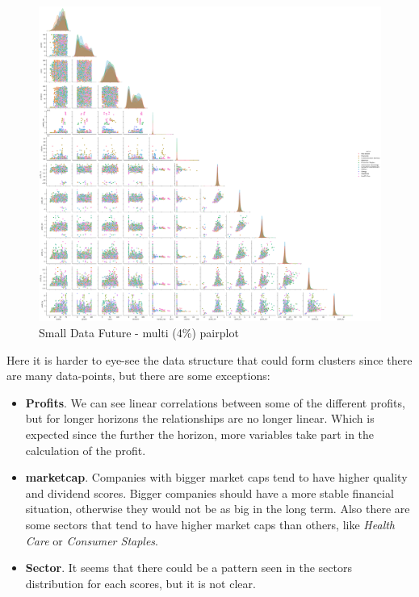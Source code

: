 \documentclass[11pt,english,a4paper,hidelinks]{book}
\begin{document}
\begin{figure}[H]
    \centering
    \includegraphics[width=1\textwidth]{images/code/descriptive analysis/correlations/Small Data future - Multi - pairplot.png}
    \caption{Small Data Future - \acrshort{multi} (4\%) \acrshort{pairplot}}
    \label{fig:pairplot_small_data_future_multi}
\end{figure}

\noindent Here it is harder to eye-see the data structure that could form clusters since there are many data-points, but there are some exceptions:
\begin{itemize}
    \item \textbf{Profits}. We can see linear correlations between some of the different profits, but for longer horizons the relationships are no longer linear. Which is expected since the further the horizon, more variables take part in the calculation of the profit.
    \item \textbf{\acrshort{marketcap}}. Companies with bigger market caps tend to have higher quality and dividend scores. Bigger companies should have a more stable financial situation, otherwise they would not be as big in the long term. Also there are some sectors that tend to have higher market caps than others, like \textit{Health Care} or \textit{Consumer Staples}.
    \item \textbf{Sector}. It seems that there could be a pattern seen in the sectors distribution for each scores, but it is not clear.
\end{itemize}
\end{document}

